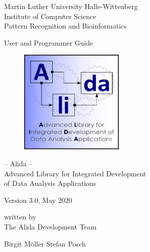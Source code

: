 
\thispagestyle{empty}

\begin{flushleft}
\large{Martin Luther University Halle-Wittenberg} \\
\normalsize{Institute of Computer Science} \\
\normalsize{Pattern Recognition and Bioinformatics}
\end{flushleft}

\vspace*{1cm}

\hrulefill

\vspace*{2cm}

\begin{center}

\large{User and Programmer Guide} \\
\vspace*{0.5cm}

  \begin{figure}[htbp]
    \centering
     \includegraphics[width = 5cm]{../images/Alida_logo.pdf}
  \end{figure}
\Large{
-- Alida -- \\ Advanced Library for Integrated Development \\ of Data Analysis Applications}

\vspace*{0.7cm}

\large{
Version 3.0, May 2020
}
\vspace*{0.5cm}

\normalsize{written by}\\
\vspace*{1.0cm}
\large{The Alida Development Team}\\
\vspace*{1.0cm}
\end{center}

\begin{center}
{\Large
       {Birgit M\"oller} \hspace*{1cm} {Stefan Posch} 
}
\end{center}

